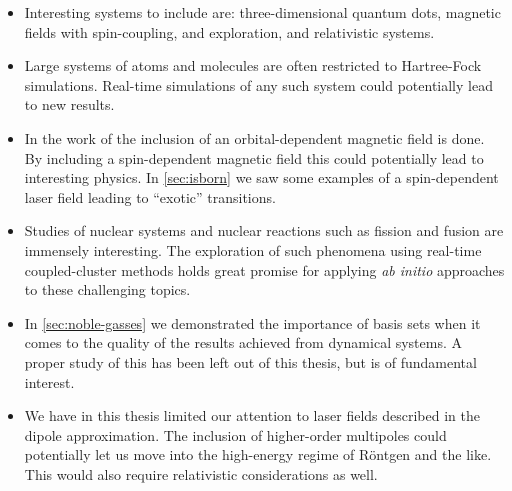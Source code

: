             \begin{itemize}
                \item Interesting systems to include are: three-dimensional
                    quantum dots, magnetic fields with spin-coupling, and
                    exploration, and relativistic systems.
                \item Large systems of atoms and molecules are often restricted
                    to Hartree-Fock simulations.
                    Real-time simulations of any such system could potentially
                    lead to new results.
                \item In the work of \citeauthor{greg-winther}
                    \cite{greg-winther} the inclusion of an orbital-dependent
                    magnetic field is done.
                    By including a spin-dependent magnetic field this could
                    potentially lead to interesting physics.
                    In \autoref{sec:isborn} we saw some examples of a
                    spin-dependent laser field leading to ``exotic''
                    transitions.
                \item Studies of nuclear systems and nuclear reactions such as
                    fission and fusion are immensely interesting.
                    The exploration of such phenomena using real-time
                    coupled-cluster methods holds great promise for applying
                    \emph{ab initio} approaches to these challenging topics.
                \item In \autoref{sec:noble-gasses} we demonstrated the
                    importance of basis sets when it comes to the quality of the
                    results achieved from dynamical systems.
                    A proper study of this has been left out of this thesis, but
                    is of fundamental interest.
                \item We have in this thesis limited our attention to laser
                    fields described in the dipole approximation.
                    The inclusion of higher-order multipoles could potentially
                    let us move into the high-energy regime of Röntgen and the
                    like.
                    This would also require relativistic considerations as well.
            \end{itemize}

\clearemptydoublepage
